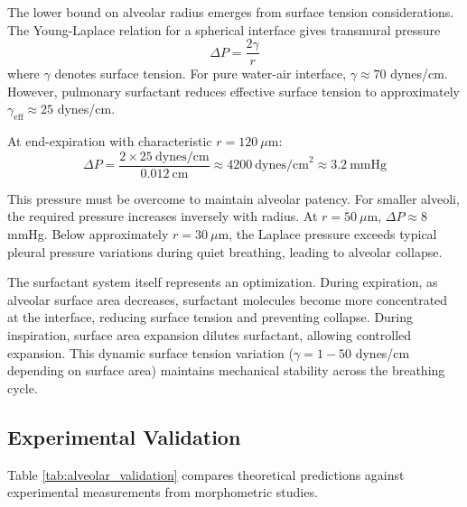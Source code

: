 \documentclass[12pt,a4paper]{article}
\theoremstyle{remark}
\begin{document}
The lower bound on alveolar radius emerges from surface tension considerations. The Young-Laplace relation for a spherical interface gives transmural pressure
\begin{equation}
\Delta P = \frac{2\gamma}{r}
\end{equation}
where $\gamma$ denotes surface tension. For pure water-air interface, $\gamma \approx 70$ dynes/cm. However, pulmonary surfactant reduces effective surface tension to approximately $\gamma_{\mathrm{eff}} \approx 25$ dynes/cm.

At end-expiration with characteristic $r = 120~\mu$m:
\begin{equation}
\Delta P = \frac{2 \times 25~\mathrm{dynes/cm}}{0.012~\mathrm{cm}} \approx 4200~\mathrm{dynes/cm}^{2} \approx 3.2~\mathrm{mmHg}
\end{equation}

This pressure must be overcome to maintain alveolar patency. For smaller alveoli, the required pressure increases inversely with radius. At $r = 50~\mu$m, $\Delta P \approx 8$ mmHg. Below approximately $r = 30~\mu$m, the Laplace pressure exceeds typical pleural pressure variations during quiet breathing, leading to alveolar collapse.

The surfactant system itself represents an optimization. During expiration, as alveolar surface area decreases, surfactant molecules become more concentrated at the interface, reducing surface tension and preventing collapse. During inspiration, surface area expansion dilutes surfactant, allowing controlled expansion. This dynamic surface tension variation ($\gamma = 1-50$ dynes/cm depending on surface area) maintains mechanical stability across the breathing cycle.

\subsection{Experimental Validation}

Table \ref{tab:alveolar_validation} compares theoretical predictions against experimental measurements from morphometric studies.
\end{document}
